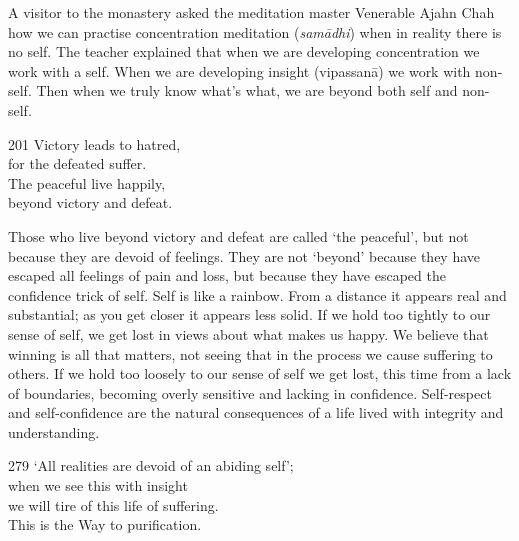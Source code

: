\begin{dhpRefl}
  A visitor to the monastery asked the meditation master Venerable Ajahn Chah how we can practise concentration meditation (\emph{samādhi}) when in reality there is no self. The teacher explained that when we are developing concentration we work with a self. When we are developing insight (vipassanā) we work with non-self. Then when we truly know what's what, we are beyond both self and non-self.
\end{dhpRefl}


\begin{dhpVerse}{201}
\label{dhp-201}
Victory leads to hatred,\\
for the defeated suffer.\\
The peaceful live happily,\\
beyond victory and defeat.
\end{dhpVerse}

\begin{dhpRefl}
Those who live beyond victory and defeat are called `the peaceful', but not because they are devoid of feelings. They are not `beyond' because they have escaped all feelings of pain and loss, but because they have escaped the confidence trick of self. Self is like a rainbow. From a distance it appears real and substantial; as you get closer it appears less solid. If we hold too tightly to our sense of self, we get lost in views about what makes us happy. We believe that winning is all that matters, not seeing that in the process we cause suffering to others. If we hold too loosely to our sense of self we get lost, this time from a lack of boundaries, becoming overly sensitive and lacking in confidence. Self-respect and self-confidence are the natural consequences of a life lived with integrity and understanding.
\end{dhpRefl}


\begin{dhpVerse}{279}
\label{dhp-279}
`All realities are devoid of an abiding self';\\
when we see this with insight\\
we will tire of this life of suffering.\\
This is the Way to purification.
\end{dhpVerse}

